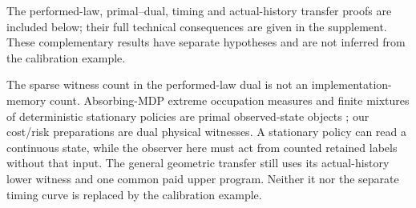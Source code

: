The performed-law, primal--dual, timing and actual-history transfer proofs are included below; their full technical consequences are given in the supplement. These complementary results have separate hypotheses and are not inferred from the calibration example.


The sparse witness count in the performed-law dual is not an implementation-memory count. Absorbing-MDP extreme occupation measures and finite mixtures of deterministic stationary policies are primal observed-state objects \cite{PiunovskiyZhang24,DufourMixtures}; our cost/risk preparations are dual physical witnesses. A stationary policy can read a continuous state, while the observer here must act from counted retained labels without that input. The general geometric transfer still uses its actual-history lower witness and one common paid upper program. Neither it nor the separate timing curve is replaced by the calibration example.
